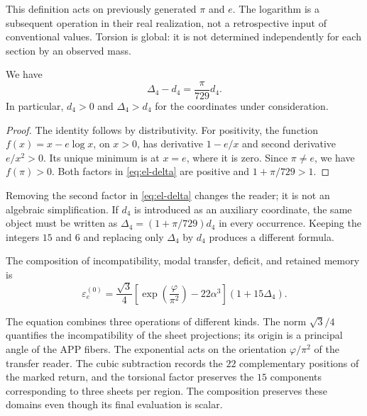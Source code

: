 This definition acts on previously generated \(\pi\) and \(e\). The
logarithm is a subsequent operation in their real realization, not a
retrospective input of conventional values. Torsion is global:
it is not determined independently for each section by an observed
mass.

\begin{lemma}
We have
\begin{equation}
 \Delta_4-d_4=\frac{\pi}{729}d_4.
 \label{eq:el-delta-diferencia}
\end{equation}
In particular, \(d_4>0\) and \(\Delta_4>d_4\) for the coordinates
under consideration.
\end{lemma}
\begin{proof}
The identity follows by distributivity. For positivity, the function
\(f(x)=x-e\log x\), on \(x>0\), has derivative \(1-e/x\) and
second derivative \(e/x^2>0\). Its unique minimum is at \(x=e\), where
it is zero. Since \(\pi\ne e\), we have \(f(\pi)>0\). Both factors
in \eqref{eq:el-delta} are positive and \(1+\pi/729>1\).
\end{proof}

\begin{remark}
Removing the second factor in \eqref{eq:el-delta} changes the reader; it
is not an algebraic simplification. If \(d_4\) is introduced as an
auxiliary coordinate, the same object must be written as
\(\Delta_4=(1+\pi/729)d_4\) in every occurrence. Keeping the
integers \(15\) and \(6\) and replacing only \(\Delta_4\) by \(d_4\)
produces a different formula.
\end{remark}

\begin{definition}
The composition of incompatibility, modal transfer, deficit, and retained memory
is
\begin{equation}
 \varepsilon_e^{(0)}
 =\frac{\sqrt3}{4}
  \left[\exp\!\left(\frac{\varphi}{\pi^2}\right)-22\alpha^3\right]
  (1+15\Delta_4).
 \label{eq:el-basal}
\end{equation}
\end{definition}

The equation combines three operations of different kinds. The norm
\(\sqrt3/4\) quantifies the incompatibility of the sheet
projections; its origin is a principal angle of the APP fibers.
The exponential acts on the orientation \(\varphi/\pi^2\) of the
transfer reader. The cubic subtraction records the \(22\) complementary
positions of the marked return, and the torsional factor preserves the
\(15\) components corresponding to three sheets per region. The
composition preserves these domains even though its final evaluation is scalar.

